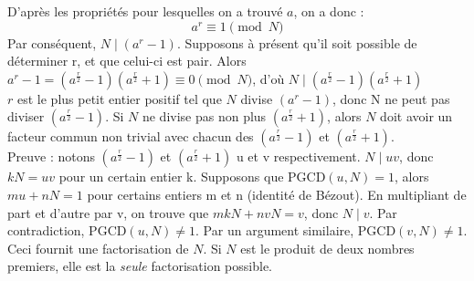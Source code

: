 \documentclass[12pt]{article}
\begin{document}
D'après les propriétés pour lesquelles on a trouvé $a$, on a donc :
$$a^r \equiv 1 \pmod N$$
Par conséquent, $N \mid (a^r -1)$. Supposons à présent qu'il soit possible de déterminer r, et que celui-ci est pair. Alors
\\
$a^r -1 = (a^{\frac{r}{2}} -1)(a^{\frac{r}{2}}+1) \equiv 0 \pmod N$, d'où $N \mid (a^{\frac{r}{2}} -1)(a^{\frac{r}{2}}+1)$
\\
$r$ est le plus petit entier positif tel que $N$ divise $(a^r -1)$, donc N ne peut pas diviser $(a^{\frac{r}{2}}-1)$. Si $N$ ne divise pas non plus $(a^{\frac{r}{2}}+1)$, alors $N$ doit avoir un facteur commun non trivial avec chacun des $(a^{\frac{r}{2}}-1)$ et $(a^{\frac{r}{2}}+1)$.
\\
Preuve : notons $(a^{\frac{r}{2}}-1)$ et $(a^{\frac{r}{2}}+1)$ u et v respectivement. $N \mid uv$, donc $kN=uv$ pour un certain entier k. Supposons que PGCD$(u, N)=1$, alors $mu +nN=1$ pour certains entiers m et n (identité de Bézout). En multipliant de part et d'autre par v, on trouve que $mkN + nvN=v$, donc $N \mid v$. Par contradiction, PGCD$(u, N)\neq 1$. Par un argument similaire, PGCD$(v, N) \neq 1$.
\\
Ceci fournit une factorisation de $N$. Si $N$ est le produit de deux nombres premiers, elle est la \textit{seule} factorisation possible.
\end{document}
